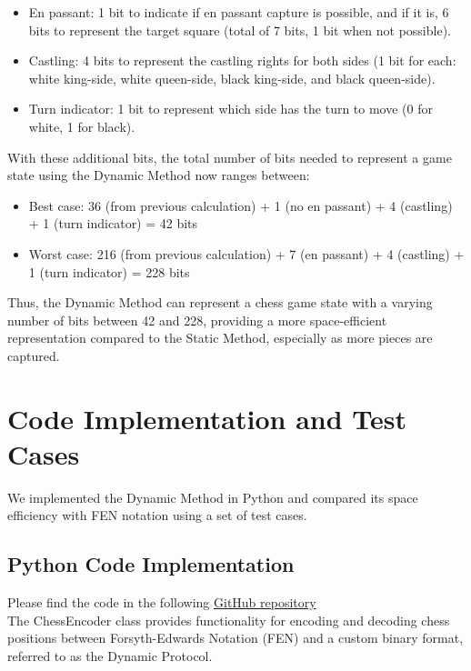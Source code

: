\documentclass{article}
\begin{document}
\begin{itemize}  
    \item En passant: 1 bit to indicate if en passant capture is possible, and if it is, 6 bits to represent the target square (total of 7 bits, 1 bit when not possible).  
    \item Castling: 4 bits to represent the castling rights for both sides (1 bit for each: white king-side, white queen-side, black king-side, and black queen-side).  
    \item Turn indicator: 1 bit to represent which side has the turn to move (0 for white, 1 for black).  
\end{itemize}  
   
With these additional bits, the total number of bits needed to represent a game state using the Dynamic Method now ranges between:  
   
\begin{itemize}  
    \item Best case: 36 (from previous calculation) + 1 (no en passant) + 4 (castling) + 1 (turn indicator) = 42 bits  
    \item Worst case: 216 (from previous calculation) + 7 (en passant) + 4 (castling) + 1 (turn indicator) = 228 bits  
\end{itemize}  
   
Thus, the Dynamic Method can represent a chess game state with a varying number of bits between 42 and 228, providing a more space-efficient representation compared to the Static Method, especially as more pieces are captured.

\newpage
\section{Code Implementation and Test Cases}
   
We implemented the Dynamic Method in Python and compared its space efficiency with FEN notation using a set of test cases.
   
\subsection{Python Code Implementation}

Please find the code in the following \href{http://www.overleaf.com}{GitHub repository}  \\

The ChessEncoder class provides functionality for encoding and decoding chess positions between Forsyth-Edwards Notation (FEN) and a custom binary format, referred to as the Dynamic Protocol.  \\
\end{document}
